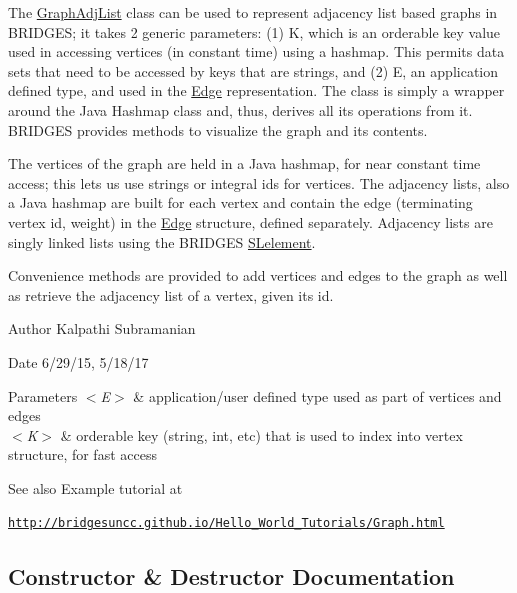 The \hyperlink{classbridges_1_1base_1_1_graph_adj_list}{Graph\+Adj\+List} class can be used to represent adjacency list based graphs in B\+R\+I\+D\+G\+ES; it takes 2 generic parameters\+: (1) K, which is an orderable key value used in accessing vertices (in constant time) using a hashmap. This permits data sets that need to be accessed by keys that are strings, and (2) E, an application defined type, and used in the \hyperlink{classbridges_1_1base_1_1_edge}{Edge} representation. The class is simply a wrapper around the Java Hashmap class and, thus, derives all its operations from it. B\+R\+I\+D\+G\+ES provides methods to visualize the graph and its contents.

The vertices of the graph are held in a Java hashmap, for near constant time access; this lets us use strings or integral ids for vertices. The adjacency lists, also a Java hashmap are built for each vertex and contain the edge (terminating vertex id, weight) in the \hyperlink{classbridges_1_1base_1_1_edge}{Edge} structure, defined separately. Adjacency lists are singly linked lists using the B\+R\+I\+D\+G\+ES \hyperlink{classbridges_1_1base_1_1_s_lelement}{S\+Lelement}.

Convenience methods are provided to add vertices and edges to the graph as well as retrieve the adjacency list of a vertex, given its id.

\begin{DoxyAuthor}{Author}
Kalpathi Subramanian
\end{DoxyAuthor}
\begin{DoxyDate}{Date}
6/29/15, 5/18/17
\end{DoxyDate}

\begin{DoxyParams}{Parameters}
{\em $<$\+E$>$} & application/user defined type used as part of vertices and edges \\
\hline
{\em $<$\+K$>$} & orderable key (string, int, etc) that is used to index into vertex structure, for fast access\\
\hline
\end{DoxyParams}
\begin{DoxySeeAlso}{See also}
Example tutorial at 
\end{DoxySeeAlso}
\href{http://bridgesuncc.github.io/Hello_World_Tutorials/Graph.html}{\tt http\+://bridgesuncc.\+github.\+io/\+Hello\+\_\+\+World\+\_\+\+Tutorials/\+Graph.\+html} 

\subsection{Constructor \& Destructor Documentation}
\hypertarget{classbridges_1_1base_1_1_graph_adj_list_a822f5f0981773a227c98c463850a0700}{}\label{classbridges_1_1base_1_1_graph_adj_list_a822f5f0981773a227c98c463850a0700} 
